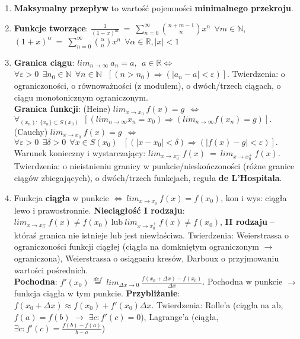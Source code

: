 \documentclass[12pt]{article}
\begin{document}
\begin{enumerate}
        \item \textbf{Maksymalny przepływ} to wartość pojemności \textbf{minimalnego przekroju}.

        \item \textbf{Funkcje tworzące}:
        $\frac{1}{(1-x)^m} ~ = ~ \sum_{n=0}^{\infty} \binom{n+m-1}{n} x^n ~~ \forall m \in \mathbb{N}$,\\
        $(1+x)^{\alpha} ~ = ~ \sum_{n=0}^{\infty} \binom{\alpha}{n} x^n ~~ \forall \alpha \in \mathbb{R}, |x| < 1$

        \item \textbf{Granica ciągu}: $lim_{n  \rightarrow \infty} ~ a_n = a, ~~ a \in \mathbb{R} \Leftrightarrow$\\
        $  \forall \varepsilon > 0 ~~ \exists  n_0 \in \mathbb{N} ~~ \forall n \in \mathbb{N} ~~~ [(n > n_0) \Rightarrow (|a_n - a| < \varepsilon)]$.
        Twierdzenia: o ograniczoności, o równoważności (z modułem), o dwóch/trzech ciągach, o ciągu monotonicznym
        ograniczonym.\\
        \textbf{Granica funkcji}:
        (Heine) $lim_{x \rightarrow x_0} ~ f(x) = g ~~ \Leftrightarrow$\\
        $\forall_{(x_n): ~ \{x_n\} \subset S(x_0)} ~~ [(lim_{n \rightarrow \infty} x_n = x_0) \Rightarrow (lim_{n \rightarrow \infty} f(x_n) = g)].$\\
        (Cauchy)    $lim_{x \rightarrow x_0} ~ f(x)  = g ~~ \Leftrightarrow$\\
        $\forall \varepsilon > 0 ~~ \exists \delta > 0 ~~ \forall  x \in S(x_0)  ~~~ [(|x - x_0| <  \delta) \Rightarrow (|f(x) - g| < \varepsilon)].$
        Warunek konieczny i wystarczający: $lim_{x \rightarrow x^{-}_0}  ~ f(x) ~ = ~ lim_{x \rightarrow x^{+}_0}  ~ f(x)$.
        Twierdzenia: o nieistnieniu granicy w punkcie/nieskończoności (różne granice ciągów zbiegających),
        o dwóch/trzech funkcjach, reguła \textbf{de L'Hospitala}.

        \item Funkcja \textbf{ciągła} w punkcie $\Leftrightarrow ~ lim_{x \rightarrow x_0} ~ f(x) = f(x_0)$,
        kon i wys: ciągła lewo i prawostronnie. \textbf{Nieciągłość I rodzaju}:
        $lim_{x \rightarrow x^{-}_0} ~ f(x) \neq  f(x_0) ~ \text{lub} ~ lim_{x \rightarrow x^{+}_0} ~ f(x) \neq f(x_0)$,
        \textbf{II rodzaju} -- któraś granica nie istnieje lub jest niewłaściwa.
        Twierdzenia: Weierstrassa o ograniczoności funkcji ciągłej (ciągła na domkniętym ograniczonym $\rightarrow$ ograniczona),
        Weierstrassa o osiąganiu kresów, Darboux o przyjmowaniu wartości pośrednich.\\
        \textbf{Pochodna}: $f'(x_0) ~ \stackrel{def}{=} ~ lim_{\Delta x \rightarrow 0} ~ \frac{f(x_0 + \Delta x) - f(x_0)}{\Delta x}$.
        Pochodna w punkcie $\rightarrow$ funkcja ciągła w tym punkcie. \textbf{Przybliżanie}: $f(x_0 + \Delta x) \approx f(x_0) + f'(x_0)\Delta x$.
        Twierdzenia: Rolle'a (ciągła na ab, $f(a) = f(b)$ $\rightarrow$ $\exists c : f'(c) = 0$),
        Lagrange'a (ciągła, $\exists c : f'(c) = \frac{f(b)-f(a)}{b-a}$)


\end{enumerate}
\end{document}
